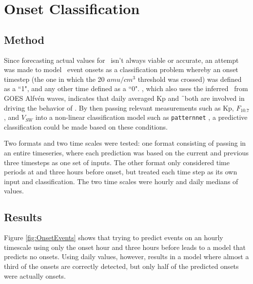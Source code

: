 \chapter[Onset Classification]{Onset Classification}

\section{Method}
Since forecasting actual values for \req\ isn't always viable or accurate, an attempt was made to model \req\ event onsets as a classification problem whereby an onset timestep (the one in which the 20 $amu/cm^3$ threshold was crossed) was defined as a ``1", and any other time defined as a ``0". \cite{Denton2016}, which also uses the inferred \req\ from GOES Alfvén waves, indicates that daily averaged Kp and \f\ both are involved in driving the behavior of \req. By then passing relevant measurements such as Kp, $F_{10.7}$, and $V_{SW}$ into a non-linear classification model such as \texttt{patternnet} \citep{MATLAB:2014}, a predictive classification could be made based on these conditions.

Two formats and two time scales were tested: one format consisting of passing in an entire timeseries, where each prediction was based on the current and previous three timesteps as one set of inputs. The other format only considered time periods at and three hours before onset, but treated each time step as its own input and classification. The two time scales were hourly and daily medians of values.


\section{Results}

Figure \ref{fig:OnsetEvents} shows that trying to predict events on an hourly timescale using only the onset hour and three hours before leads to a model that predicts no onsets. Using daily values, however, results in a model where almost a third of the onsets are correctly detected, but only half of the predicted onsets were actually onsets.

